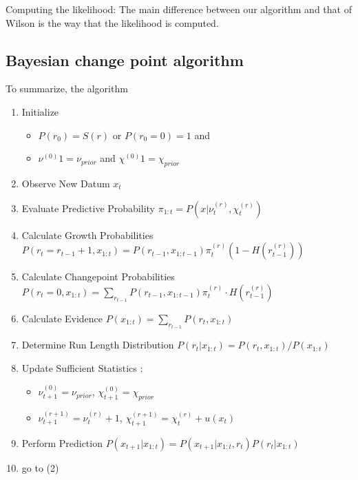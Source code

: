 \documentclass[profile,final,english, draft]{article}%
\begin{document}
Computing the likelihood:
The main difference between our algorithm and that of Wilson is the way that the likelihood is computed.

\subsection{Bayesian change point algorithm}

To summarize, the algorithm 

\begin{enumerate}
	\item     Initialize

	\begin{itemize}
		\item    $P(r_0)= S(r)$ or $P(r_0=0)=1$ and
		\item    $\nu^{(0)}1 = \nu_{prior}$ and $\chi^{(0)}1 = \chi_{prior}$
	\end{itemize}

	\item    Observe New Datum $x_t$
    \item    Evaluate Predictive Probability $\pi_{1:t} = P(x |\nu^{(r)}_t,\chi^{(r)}_t)$
    \item    Calculate Growth Probabilities $P(r_t=r_{t-1}+1, x_{1:t}) = P(r_{t-1}, x_{1:t-1}) \pi^{(r)}_t (1-H(r^{(r)}_{t-1}))$
    \item    Calculate Changepoint Probabilities $P(r_t=0, x_{1:t})= \sum_{r_{t-1}} P(r_{t-1}, x_{1:t-1}) \pi^{(r)}_t \cdot H(r^{(r)}_{t-1})$
    \item    Calculate Evidence $P(x_{1:t}) = \sum_{r_{t-1}} P (r_t, x_{1:t})$
    \item    Determine Run Length Distribution $P (r_t | x_{1:t}) = P (r_t, x_{1:t})/P (x_{1:t}) $
    \item    Update Sufficient Statistics :
	\begin{itemize}
		\item    $\nu^{(0)}_{t+1} = \nu_{prior}$, $\chi^{(0)}_{t+1} = \chi_{prior}$
		\item    $\nu^{(r+1)}_{t+1} = \nu^{(r)}_{t} +1$, $\chi^{(r+1)}_{t+1} = \chi^{(r)}_{t} + u(x_t)$
	\end{itemize}

    \item    Perform Prediction $P (x_{t+1} | x_{1:t}) = P (x_{t+1}|x_{1:t} , r_t) P (r_t|x_{1:t})$
    \item    go to (2)
\end{enumerate}
\end{document}
